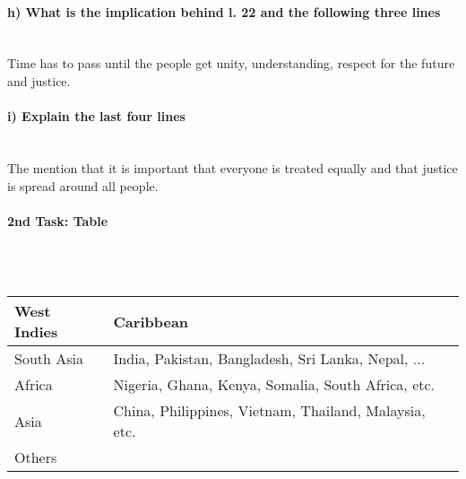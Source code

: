 \documentclass[12pt,a4paper]{report}
\begin{document}
	\paragraph{h) What is the implication behind l. 22 and the following three lines} \mbox{} \\
	Time has to pass until the people get unity, understanding, respect for the future and justice.
	\paragraph{i) Explain the last four lines} \mbox{} \\
	The mention that it is important that everyone is treated equally and that justice is spread around all people.
	\paragraph{2nd Task: Table} \mbox{} \\\\
	\begin{tabularx}{\linewidth}{|X|X|}
		\hline
		West Indies & Caribbean \\
		\hline
		South Asia & India, Pakistan, Bangladesh, Sri Lanka, Nepal, ... \\
		\hline
		Africa & Nigeria, Ghana, Kenya, Somalia, South Africa, etc. \\
		\hline
		Asia & China, Philippines, Vietnam, Thailand, Malaysia, etc. \\
		\hline
		Others &  \\
		\hline
	\end{tabularx}
\end{document}
